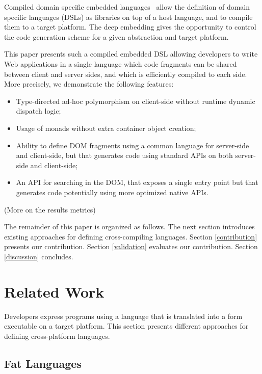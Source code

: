 \documentclass[preprint]{sigplanconf}
\begin{document}
Compiled domain specific embedded languages~\cite{Elliott2003_Compiling} allow the definition of domain specific
languages (DSLs) as libraries on top of a host language, and to compile them to a target platform. The deep embedding
gives the opportunity to control the code generation scheme for a given abstraction and target platform.

This paper presents such a compiled embedded DSL allowing developers to write Web applications in a single language
which code fragments can be shared between client and server sides, and which is efficiently compiled to each side.
More precisely, we demonstrate the following features:

\begin{itemize}
 \item Type-directed ad-hoc polymorphism on client-side without runtime dynamic dispatch logic;
 \item Usage of monads without extra container object creation;
 \item Ability to define DOM fragments using a common language for server-side and client-side, but that generates
code using standard APIs on both server-side and client-side;
 \item An API for searching in the DOM, that exposes a single entry point but that generates code potentially using
more optimized native APIs.
\end{itemize}

(More on the results metrics)

The remainder of this paper is organized as follows. The next section introduces existing approaches for defining
cross-compiling languages. Section \ref{contribution} presents our contribution. Section \ref{validation} evaluates
our contribution. Section \ref{discussion} concludes.

\section{Related Work}

Developers express programs using a language that is translated into a form executable on a target platform. This
section presents different approaches for defining cross-platform languages.

\subsection{Fat Languages}
\end{document}
